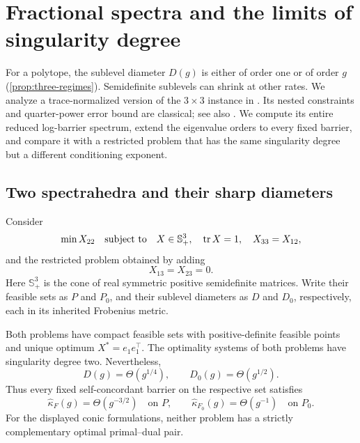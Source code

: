 \section{Fractional spectra and the limits of singularity degree}
\label{sec:fractional-sdp}

For a polytope, the sublevel diameter $D(g)$ is either of order one or
of order $g$ (\cref{prop:three-regimes}). Semidefinite sublevels can
shrink at other rates. We analyze a trace-normalized version of the
$3\times3$ instance in \citet[Example 2]{sturm2000}. Its nested
constraints and quarter-power error bound are classical; see also
\citet[Theorem 4.5.1, Example 4.5.2, and Section 4.7]{drusvyatskiy2017}.
We compute its entire reduced log-barrier spectrum, extend the
eigenvalue orders to every fixed barrier, and compare it with a restricted
problem that has the same singularity degree but a different
conditioning exponent.

\subsection{Two spectrahedra and their sharp diameters}

Consider
\begin{equation}
 \min X_{22}\quad\text{subject to}\quad
 X\in\mathbb S^3_+,\quad \operatorname{tr} X=1,\quad X_{33}=X_{12},
 \label{eq:fractional-sdp}
\end{equation}
and the restricted problem obtained by adding
\begin{equation}
 X_{13}=X_{23}=0.
 \label{eq:restricted-sdp}
\end{equation}
Here $\mathbb S^3_+$ is the cone of real symmetric positive
semidefinite matrices. Write their feasible sets as $P$ and $P_0$,
and their sublevel diameters as $D$ and $D_0$, respectively, each
in its inherited Frobenius metric.

\begin{proposition}
\label{prop:paired-sdp}
Both problems have compact feasible sets with positive-definite
feasible points and unique optimum $X^*=e_1e_1^\top$. The optimality
systems of both problems have singularity degree two. Nevertheless,
\begin{equation}
 D(g)=\Theta(g^{1/4}),\qquad D_0(g)=\Theta(g^{1/2}).
 \label{eq:paired-diameters}
\end{equation}
Thus every fixed self-concordant barrier on the respective set satisfies
\begin{equation}
 \widehat\kappa_F(g)=\Theta(g^{-3/2})\quad\text{on }P,
 \qquad
 \widehat\kappa_{F_0}(g)=\Theta(g^{-1})\quad\text{on }P_0.
 \label{eq:paired-conditioning}
\end{equation}
For the displayed conic formulations, neither problem has a strictly
complementary optimal primal--dual pair.
\end{proposition}

